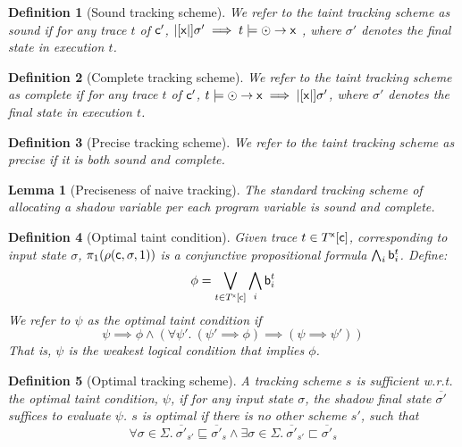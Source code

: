 \documentclass[]{article}
\newcommand{\lsyn}{|[}
\newcommand{\rsyn}{|]}
\newtheorem{defn}{Definition}
\newtheorem{lem}{Lemma}
\begin{document}
\begin{defn}[Sound tracking scheme] We refer to the taint tracking scheme as \emph{sound} if for any trace $t$ of ${\sf c'}$, 
	$\lsyn {\sf x} \rsyn \sigma' \implies t \models \odot \rightarrow {\sf x}$ , where $\sigma'$ denotes the final state in execution $t$.
\end{defn}

\begin{defn}[Complete tracking scheme] We refer to the taint tracking scheme as \emph{complete} if for any trace $t$ of ${\sf c'}$, 
	$t \models \odot \rightarrow {\sf x} \implies \lsyn {\sf x} \rsyn \sigma'$, where $\sigma'$ denotes the final state in execution $t$.
\end{defn}

\begin{defn}[Precise tracking scheme] We refer to the taint tracking scheme as \emph{precise} if it is both sound and complete.
\end{defn}

\begin{lem}[Preciseness of naive tracking] The standard tracking scheme of allocating a shadow variable per each program variable is sound and complete. 
\end{lem}

\begin{defn}[Optimal taint condition] Given trace $t \in T^{\sf x}[{\sf c}]$,
	corresponding to input state $\sigma$, $\pi_1(\rho({\sf c}, \sigma, 1))$ is
	a conjunctive propositional formula $\bigwedge_i {\sf b}^t_i$. Define:
	$$
		\phi = \bigvee_{t \in T^{\sf x}[{\sf c}]} \bigwedge_i {\sf b}^t_i 
	$$
	We refer to $\psi$ as the \emph{optimal taint condition} if
	$$
	\psi \implies \phi \wedge (\forall \psi'.\ (\psi' \implies \phi) \implies (\psi \implies \psi'))
	$$
	That is, $\psi$ is the weakest logical condition that implies $\phi$.
\end{defn}

\begin{defn}[Optimal tracking scheme] A tracking scheme $s$ is \emph{sufficient} w.r.t. the optimal taint condition, $\psi$, if for any input state $\sigma$, the shadow final state $\overline{\sigma'}$ suffices to evaluate $\psi$. $s$ is \emph{optimal} if there is no other scheme $s'$, such that
	$$
	\forall \sigma \in \Sigma.\ \overline{\sigma'}_{s'} \sqsubseteq  \overline{\sigma'}_{s} \wedge \exists \sigma \in \Sigma.\ \overline{\sigma'}_{s'} \sqsubset  \overline{\sigma'}_{s}
	$$
	
\end{defn}
\end{document}
